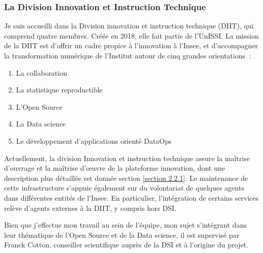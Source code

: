 \subsubsection{La Division Innovation et Instruction Technique}
Je suis accueilli dans la Division innovation et instruction technique (DIIT), qui comprend quatre membres. Créée en 2018, elle fait partie de l'UnISSI. La mission de la DIIT est d'offrir un cadre propice à l'innovation à l'Insee, et d'accompagner la transformation numérique de l'Institut autour de cinq grandes orientations~:
\begin{enumerate}
    \item La collaboration
    \item La statistique reproductible
    \item L'Open Source 
    \item La Data science
    \item Le développement d'applications orienté DataOps
    \newline
\end{enumerate}

Actuellement, la division Innovation et instruction technique assure la maîtrise d’ouvrage et la maîtrise d’œuvre de la plateforme innovation, dont une description plus détaillée est donnée section \ref{section 2.2.1}. Le maintenance de cette infrastructure s’appuie également sur du volontariat de quelques agents dans différentes entités de l’Insee. En particulier, l’intégration de certains services relève d’agents externes à la DIIT, y compris hors DSI. 
\newline

Bien que j'effectue mon travail au sein de l'équipe, mon sujet s'intégrant dans leur thématique de l'Open Source et de la Data science, il est supervisé par Franck Cotton, conseiller scientifique auprès de la DSI et à l'origine du projet. 
\newline

